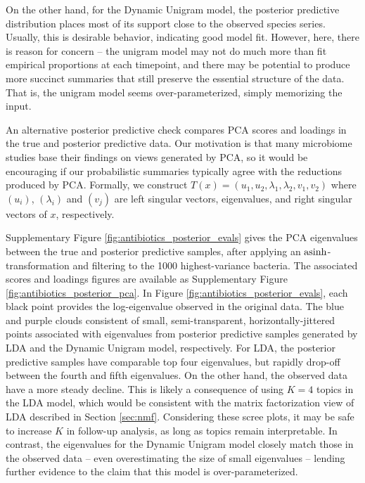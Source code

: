 On the other hand, for the Dynamic Unigram model, the posterior predictive
distribution places most of its support close to the observed species series.
Usually, this is desirable behavior, indicating good model fit. However, here,
there is reason for concern -- the unigram model may not do much more than fit
empirical proportions at each timepoint, and there may be potential to produce
more succinct summaries that still preserve the essential structure of the data.
That is, the unigram model seems over-parameterized, simply memorizing the
input.

An alternative posterior predictive check compares PCA scores and loadings in
the true and posterior predictive data. Our motivation is that many microbiome
studies base their findings on views generated by PCA, so it would be
encouraging if our probabilistic summaries typically agree with the reductions
produced by PCA. Formally, we construct $T\left(x\right) = \left(u_{1}, u_{2},
\lambda_{1}, \lambda_{2}, v_{1}, v_{2}\right)$ where $\left(u_{i}\right)$,
$\left(\lambda_{i}\right)$ and $\left(v_{j}\right)$ are left singular vectors,
eigenvalues, and right singular vectors of $x$, respectively.

Supplementary Figure \ref{fig:antibiotics_posterior_evals} gives the PCA
eigenvalues between the true and posterior predictive samples, after applying an
$\mathop\mathrm{asinh}$-transformation and filtering to the 1000 highest-variance bacteria. The
associated scores and loadings figures are available as Supplementary Figure
\ref{fig:antibiotics_posterior_pca}. In Figure
\ref{fig:antibiotics_posterior_evals}, each black point provides the
log-eigenvalue observed in the original data. The blue and purple clouds
consistent of small, semi-transparent, horizontally-jittered points associated
with eigenvalues from posterior predictive samples generated by LDA and the
Dynamic Unigram model, respectively. For LDA, the posterior predictive samples
have comparable top four eigenvalues, but rapidly drop-off between the fourth
and fifth eigenvalues. On the other hand, the observed data have a more steady
decline. This is likely a consequence of using $K = 4$ topics in the LDA model,
which would be consistent with the matrix factorization view of LDA described in
Section \ref{sec:nmf}. Considering these scree plots, it may be safe to increase
$K$ in follow-up analysis, as long as topics remain interpretable. In contrast,
the eigenvalues for the Dynamic Unigram model closely match those in the
observed data -- even overestimating the size of small eigenvalues -- lending
further evidence to the claim that this model is over-parameterized.

